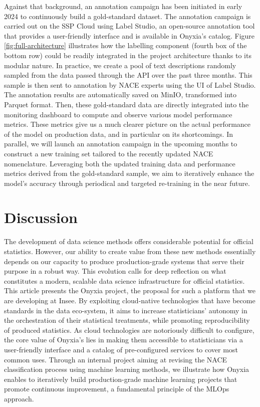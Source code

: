 \documentclass[graybox]{svmult}
\begin{document}
Against that background, an annotation campaign has been initiated in early 2024 to continuously build a gold-standard dataset. The annotation campaign is carried out on the SSP Cloud using Label Studio, an open-source annotation tool that provides a user-friendly interface and is available in Onyxia's catalog. Figure \ref{fig:full-architecture} illustrates how the labelling component (fourth box of the bottom row) could be readily integrated in the project architecture thanks to its modular nature. In practice, we create a pool of text descriptions randomly sampled from the data passed through the API over the past three months. This sample is then sent to annotation by NACE experts using the UI of Label Studio. The annotation results are automatically saved on MinIO, transformed into Parquet format. Then, these gold-standard data are directly integrated into the monitoring dashboard to compute and observe various model performance metrics. These metrics give us a much clearer picture on the actual performance of the model on production data, and in particular on its shortcomings. In parallel, we will launch an annotation campaign in the upcoming months to construct a new training set tailored to the recently updated NACE nomenclature. Leveraging both the updated training data and performance metrics derived from the gold-standard sample, we aim to iteratively enhance the model's accuracy through periodical and targeted re-training in the near future.


\section{Discussion}

The development of data science methods offers considerable potential for official statistics. However, our ability to create value from these new methods essentially depends on our capacity to produce production-grade systems that serve their purpose in a robust way. This evolution calls for deep reflection on what constitutes a modern, scalable data science infrastructure for official statistics. This article presents the Onyxia project, the proposal for such a platform that we are developing at Insee. By exploiting cloud-native technologies that have become standards in the data eco-system, it aims to increase statisticians' autonomy in the orchestration of their statistical treatments, while promoting reproducibility of produced statistics. As cloud technologies are notoriously difficult to configure, the core value of Onyxia's lies in making them accessible to statisticians via a user-friendly interface and a catalog of pre-configured services to cover most common uses. Through an internal project aiming at revising the NACE classification process using machine learning methods, we illustrate how Onyxia enables to iteratively build production-grade machine learning projects that promote continuous improvement, a fundamental principle of the MLOps approach.
\end{document}
